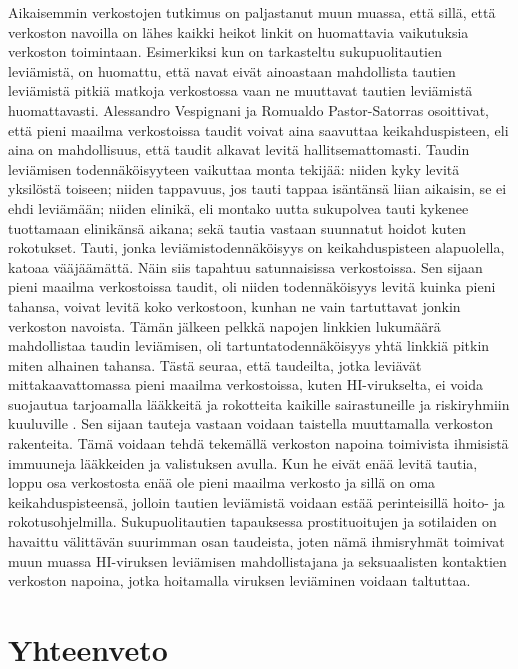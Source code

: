 \documentclass[finnish,12pt,a4paper,pdftex,elec,utf8]{aaltothesis}
\begin{document}
 
Aikaisemmin verkostojen tutkimus on paljastanut muun muassa, että sillä, että verkoston navoilla on lähes kaikki heikot linkit on huomattavia vaikutuksia verkoston toimintaan. Esimerkiksi kun on tarkasteltu sukupuolitautien leviämistä, on huomattu, että navat eivät ainoastaan mahdollista tautien leviämistä pitkiä matkoja verkostossa vaan ne muuttavat tautien leviämistä huomattavasti. Alessandro Vespignani ja Romualdo Pastor-Satorras osoittivat, \cite{Epidemic-Spreading} että pieni maailma verkostoissa taudit voivat aina saavuttaa keikahduspisteen, eli aina on mahdollisuus, että taudit alkavat levitä hallitsemattomasti. Taudin leviämisen todennäköisyyteen vaikuttaa monta tekijää: niiden kyky levitä yksilöstä toiseen; niiden tappavuus, jos tauti tappaa isäntänsä liian aikaisin, se ei ehdi leviämään; niiden elinikä, eli montako uutta sukupolvea tauti kykenee tuottamaan elinikänsä aikana; sekä tautia vastaan suunnatut hoidot kuten rokotukset. Tauti, jonka leviämistodennäköisyys on keikahduspisteen alapuolella, katoaa vääjäämättä. Näin siis tapahtuu satunnaisissa verkostoissa. Sen sijaan pieni maailma verkostoissa taudit, oli niiden todennäköisyys levitä kuinka pieni tahansa, voivat levitä koko verkostoon, kunhan ne vain tartuttavat jonkin verkoston navoista. Tämän jälkeen pelkkä napojen linkkien lukumäärä mahdollistaa taudin leviämisen, oli tartuntatodennäköisyys yhtä linkkiä pitkin miten alhainen tahansa. Tästä seuraa, että taudeilta, jotka leviävät mittakaavattomassa pieni maailma verkostoissa, kuten HI-virukselta, ei voida suojautua tarjoamalla lääkkeitä ja rokotteita kaikille sairastuneille ja riskiryhmiin kuuluville \cite{Immunization-of-complex-networks}. Sen sijaan tauteja vastaan voidaan taistella muuttamalla verkoston rakenteita. Tämä voidaan tehdä tekemällä verkoston napoina toimivista ihmisistä immuuneja lääkkeiden ja valistuksen avulla. Kun he eivät enää levitä tautia, loppu osa verkostosta enää ole pieni maailma verkosto ja sillä on oma keikahduspisteensä, jolloin tautien leviämistä voidaan estää perinteisillä hoito- ja rokotusohjelmilla. \cite{Immunization-of-complex-networks} Sukupuolitautien tapauksessa prostituoitujen ja sotilaiden on havaittu välittävän suurimman osan taudeista, joten nämä ihmisryhmät toimivat muun muassa HI-viruksen leviämisen mahdollistajana ja seksuaalisten kontaktien verkoston napoina, jotka hoitamalla viruksen leviäminen voidaan taltuttaa.



\clearpage

\section{Yhteenveto}
\end{document}
